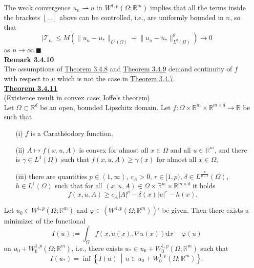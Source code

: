 The weak convergence $u_n\rightharpoonup u$ in $W^{1,p}(\Omega;\mathbb{R}^m)$ implies that all the terms inside the brackets $[\dotsc]$ above can be controlled, i.e., are uniformly bounded in $n$, so that
\[\lvert\mathcal{T}_n\rvert\leq M\left(\lVert u_n-u_*\rVert_{L^q(\Omega)}+\lVert u_n-u_*\rVert_{L^q(\Omega)}^\theta\right)\to0\]
as $n\to\infty$.\hfill$\blacksquare$\\[11pt]

\textbf{Remark 3.4.10}\\
The assumptions of \hyperlink{theorem_3_4_8}{Theorem 3.4.8} and \hyperlink{theorem_3_4_9}{Theorem 3.4.9} demand continuity of $f$ with respect to $u$ which is not the case in \hyperlink{theorem_3_4_7}{Theorem 3.4.7}.\\[11pt]

\hypertarget{theorem_3_4_11}{\textbf{\underline{Theorem 3.4.11}}}\\
(Existence result in convex case; Ioffe's theorem)\\
Let $\Omega\subset\mathbb{R}^d$ be an open, bounded Lipschitz domain. Let $f:\Omega\times\mathbb{R}^m\times\mathbb{R}^{m\times d}\longrightarrow\mathbb{R}$ be such that
\begin{itemize}
	\item[(i)] $f$ is a Carath\'eodory function,
	\item[(ii)] $A\longmapsto f(x,u,A)$ is convex for almost all $x\in\Omega$ and all $u\in\mathbb{R}^m$, and there is $\gamma\in L^1(\Omega)$ such that $f(x,u,A)\geq\gamma(x)$ for almost all $x\in\Omega$,
	\item[(iii)] there are quantities $p\in(1,\infty)$, $c_A>0$, $r\in[1,p)$, $\delta\in L^{\frac{p}{p-r}}(\Omega)$, $h\in L^1(\Omega)$ such that for all $(x,u,A)\in\Omega\times\mathbb{R}^m\times\mathbb{R}^{m\times d}$ it holds
	\[f(x,u,A)\geq c_A\lvert A\rvert^p-\delta(x)\lvert u\rvert^r-h(x).\]
\end{itemize}
Let $u_0\in W^{1,p}(\Omega;\mathbb{R}^m)$ and $\varphi\in(W^{1,p}(\Omega;\mathbb{R}^m))'$ be given. Then there exists a minimizer of the functional
\[I(u):=\int_\Omega{f(x,u(x),\nabla u(x))\mathrm{d}x}-\varphi(u)\]
on $u_0+W_0^{1,p}(\Omega;\mathbb{R}^m)$, i.e., there exists $u_*\in u_0+W_0^{1,p}(\Omega;\mathbb{R}^m)$ such that
\[I(u_*)=\inf\left\{I(u)\,\middle\vert\,u\in u_0+W_0^{1,p}(\Omega;\mathbb{R}^m)\right\}.\]

